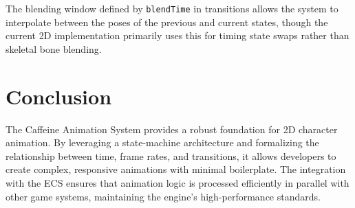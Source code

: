 The blending window defined by \texttt{blendTime} in transitions allows the system to interpolate between the poses of the previous and current states, though the current 2D implementation primarily uses this for timing state swaps rather than skeletal bone blending.

\section{Conclusion}

The Caffeine Animation System provides a robust foundation for 2D character animation. By leveraging a state-machine architecture and formalizing the relationship between time, frame rates, and transitions, it allows developers to create complex, responsive animations with minimal boilerplate. The integration with the ECS ensures that animation logic is processed efficiently in parallel with other game systems, maintaining the engine's high-performance standards.
